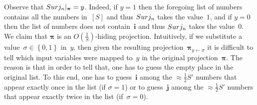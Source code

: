 \documentclass[11pt]{article}
\numberwithin{equation}{section}
\theoremstyle{definition}
\theoremstyle{plain}
\theoremstyle{definition}\newtheorem{notation}[theorem]{Notation}\theoremstyle{plain}
\newcommand{\B}{\left\{ 0,1 \right \}}
\newcommand{\p}{\boldsymbol{\pi}}
\newcommand{\surj}{\textup{\textsf{Surj}}}
\renewcommand{\i}{\boldsymbol{i}}
\renewcommand{\j}{\boldsymbol{j}}
\theoremstyle{definition}
\theoremstyle{plain}
\begin{document}
Observe that $\surj_{n}|_{\p}=y$. Indeed, if $y=1$ then the foregoing
list of numbers contains all the numbers in~$\left[S\right]$ and
thus $\surj_{n}$ takes the value~$1$, and if $y=0$ then the list
of numbers does not contain~$\i$ and thus $\surj_{n}$ takes the
%
value~$0$. We claim that $\p$ is an $O(\frac{1}{S})$-hiding projection.
Intuitively, if we substitute a value~$\sigma\in\B$ in~$y$, then
given the resulting projection~$\p_{y\gets\sigma}$ it is difficult
to tell which input variables were mapped to~$y$ in the original
projection~$\p$. The reason is that in order to tell that, one has
to guess the empty place in the original list. To this end, one has
to guess~$\i$ among the $\approx\frac{1}{2}S'$ numbers that appear
exactly once in the list (if $\sigma=1$) or to guess~$\j$ among
the $\approx\frac{1}{2}S'$ numbers that appear exactly twice in the
list (if~$\sigma=0$).
\end{document}
